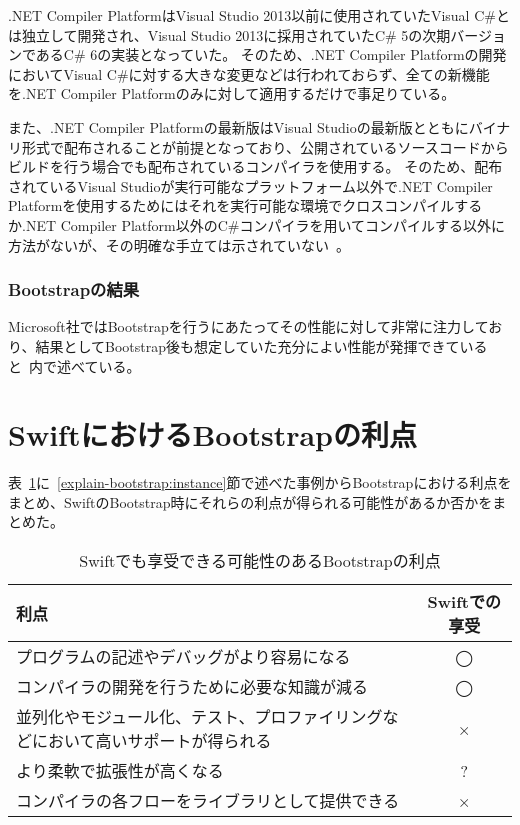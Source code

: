 .NET Compiler PlatformはVisual Studio 2013以前に使用されていたVisual C\#とは独立して開発され、Visual Studio 2013に採用されていたC\# 5の次期バージョンであるC\# 6の実装となっていた。
そのため、.NET Compiler Platformの開発においてVisual C\#に対する大きな変更などは行われておらず、全ての新機能を.NET Compiler Platformのみに対して適用するだけで事足りている。

また、.NET Compiler Platformの最新版はVisual Studioの最新版とともにバイナリ形式で配布されることが前提となっており、公開されているソースコードからビルドを行う場合でも配布されているコンパイラを使用する。
そのため、配布されているVisual Studioが実行可能なプラットフォーム以外で.NET Compiler Platformを使用するためにはそれを実行可能な環境でクロスコンパイルするか.NET Compiler Platform以外のC\#コンパイラを用いてコンパイルする以外に方法がないが、その明確な手立ては示されていない~\cite{roslyn-cross-platform}。

\subsubsection{Bootstrapの結果}

Microsoft社ではBootstrapを行うにあたってその性能に対して非常に注力しており、結果としてBootstrap後も想定していた充分によい性能が発揮できていると~\cite{roslyn-performance}内で述べている。


\section{SwiftにおけるBootstrapの利点}
\label{explain-bootstrap:merit}

表~\ref{table:bootstrap-merit}に~\ref{explain-bootstrap:instance}節で述べた事例からBootstrapにおける利点をまとめ、SwiftのBootstrap時にそれらの利点が得られる可能性があるか否かをまとめた。

\begin{table}[hb]
    \begin{center}
        \caption{Swiftでも享受できる可能性のあるBootstrapの利点}
        \begin{tabular}{|m{10cm}|c|}
            \hline
            利点 & Swiftでの享受 \\
            \hline
            プログラムの記述やデバッグがより容易になる & ◯ \\
            \hline
            コンパイラの開発を行うために必要な知識が減る & ◯ \\
            \hline
            並列化やモジュール化、テスト、プロファイリングなどにおいて高いサポートが得られる & × \\
            \hline
            より柔軟で拡張性が高くなる & ? \\
            \hline
            コンパイラの各フローをライブラリとして提供できる & × \\
            \hline
        \end{tabular}
        \label{table:bootstrap-merit}
    \end{center}
\end{table}

